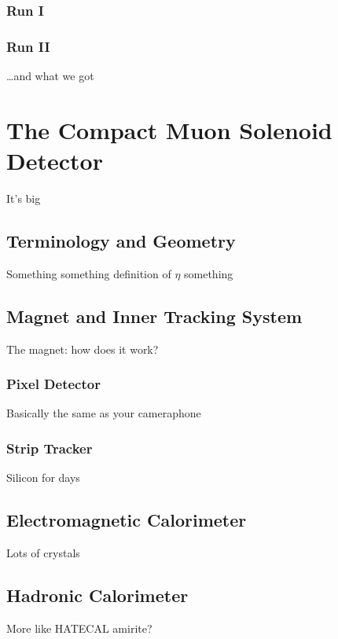 \subsubsection{Run I}


\subsubsection{Run II}
\ldots and what we got




\section{The Compact Muon Solenoid Detector}
It's big~\cite{Chatrchyan:2008zzk}

\subsection{Terminology and Geometry}
Something something definition of $\eta$ something


\subsection{Magnet and Inner Tracking System}

The magnet: how does it work?

\subsubsection{Pixel Detector}
Basically the same as your cameraphone

\subsubsection{Strip Tracker}
Silicon for days


\subsection{Electromagnetic Calorimeter}
Lots of crystals


\subsection{Hadronic Calorimeter}
More like HATECAL amirite?


